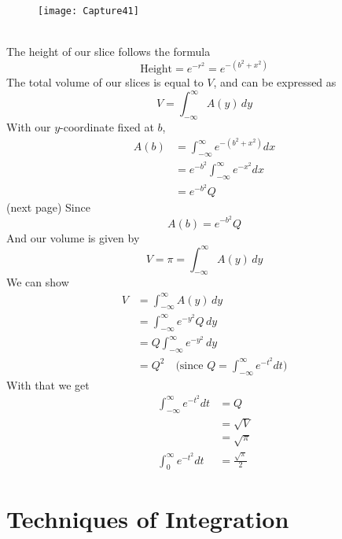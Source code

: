 \documentclass{report}
\begin{document}
\begin{figure}[h]
\texttt{[image: Capture41]}\\
\centering
{}
\end{figure}\\
The height of our slice follows the formula
\begin{equation*}
\text{Height}=e^{-r^2}=e^{-(b^2+x^2)}
\end{equation*}
The total volume of our slices is equal to $V$, and can be expressed as 
\begin{equation*}
V=\int_{-\infty}^{\infty}A(y)\,dy
\end{equation*}
With our $y$-coordinate fixed at $b$,
\begin{align*}
A(b)&=\int_{-\infty}^{\infty}e^{-(b^2+x^2)}dx\\
&=e^{-b^2}\int_{-\infty}^{\infty}e^{-x^2}dx\\
&=e^{-b^2}Q
\end{align*}
(next page)
\newpage
\noindent Since
\begin{equation*}
A(b)=e^{-b^2}Q
\end{equation*}
And our volume is given by
\begin{equation*}
V=\pi=\int_{-\infty}^{\infty}A(y)\,dy
\end{equation*}
We can show
\begin{align*}
V&=\int_{-\infty}^{\infty}A(y)\,dy\\
&=\int_{-\infty}^{\infty}e^{-y^2}Q\,dy\\
&=Q\int_{-\infty}^{\infty}e^{-y^2}\,dy\\
&=Q^2\quad\text{(since $Q=\int^{\infty}_{-\infty}e^{-t^2}dt$)}
\end{align*}
With that we get 
\begin{align*}
\int^{\infty}_{-\infty}e^{-t^2}dt&=Q\\
&=\sqrt{V}\\
&=\sqrt{\pi}\\
\int^{\infty}_{0}e^{-t^2}dt&=\frac{\sqrt{\pi}}{2}
\end{align*}
\newpage


\section{Techniques of Integration}
\end{document}
